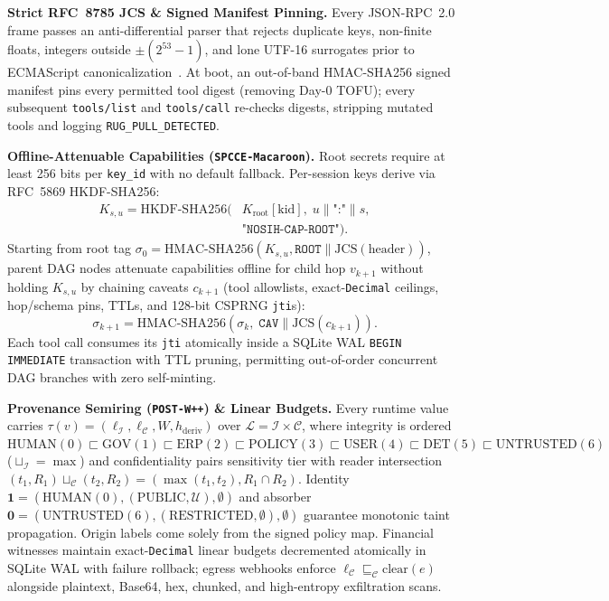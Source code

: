 \documentclass[10pt,twocolumn,letterpaper]{article}
\begin{document}
\textbf{Strict RFC~8785 JCS \& Signed Manifest Pinning.} Every JSON-RPC~2.0 frame passes an anti-differential parser that rejects duplicate keys, non-finite floats, integers outside $\pm(2^{53}-1)$, and lone UTF-16 surrogates prior to ECMAScript canonicalization~\cite{rfc8785}. At boot, an out-of-band HMAC-SHA256 signed manifest pins every permitted tool digest (removing Day-0 TOFU); every subsequent \texttt{tools/list} and \texttt{tools/call} re-checks digests, stripping mutated tools and logging \texttt{RUG\_PULL\_DETECTED}.

\textbf{Offline-Attenuable Capabilities (\texttt{SPCCE-Macaroon}).} Root secrets require at least 256 bits per \texttt{key\_id} with no default fallback. Per-session keys derive via RFC~5869 HKDF-SHA256:
\begin{equation}
\begin{aligned}
K_{s,u} = \text{HKDF-SHA256}\Big(&K_{\text{root}}[\text{kid}],\; u \parallel \texttt{":"} \parallel s,\\
&\texttt{"NOSIH-CAP-ROOT"}\Big).
\end{aligned}
\end{equation}
Starting from root tag $\sigma_0 = \text{HMAC-SHA256}(K_{s,u}, \texttt{ROOT}\parallel\text{JCS}(\text{header}))$, parent DAG nodes attenuate capabilities offline for child hop $v_{k+1}$ without holding $K_{s,u}$ by chaining caveats $c_{k+1}$ (tool allowlists, exact-\texttt{Decimal} ceilings, hop/schema pins, TTLs, and 128-bit CSPRNG \texttt{jti}s):
\begin{equation}
\sigma_{k+1} = \text{HMAC-SHA256}\!\left(\sigma_k,\; \texttt{CAV} \parallel \text{JCS}(c_{k+1})\right).
\end{equation}
Each tool call consumes its \texttt{jti} atomically inside a SQLite WAL \texttt{BEGIN IMMEDIATE} transaction with TTL pruning, permitting out-of-order concurrent DAG branches with zero self-minting.

\textbf{Provenance Semiring (\texttt{POST-W++}) \& Linear Budgets.} Every runtime value carries $\tau(v) = (\ell_{\mathcal{I}}, \ell_{\mathcal{C}}, W, h_{\text{deriv}})$ over $\mathcal{L} = \mathcal{I} \times \mathcal{C}$, where integrity is ordered $\text{HUMAN}(0) \sqsubset \text{GOV}(1) \sqsubset \text{ERP}(2) \sqsubset \text{POLICY}(3) \sqsubset \text{USER}(4) \sqsubset \text{DET}(5) \sqsubset \text{UNTRUSTED}(6)$ ($\sqcup_{\mathcal{I}}=\max$) and confidentiality pairs sensitivity tier with reader intersection $(t_1,R_1)\sqcup_{\mathcal{C}}(t_2,R_2)=(\max(t_1,t_2), R_1\cap R_2)$. Identity $\mathbf{1}=(\text{HUMAN}(0),(\text{PUBLIC},\mathcal{U}),\emptyset)$ and absorber $\mathbf{0}=(\text{UNTRUSTED}(6),(\text{RESTRICTED},\emptyset),\emptyset)$ guarantee monotonic taint propagation. Origin labels come solely from the signed policy map. Financial witnesses maintain exact-\texttt{Decimal} linear budgets decremented atomically in SQLite WAL with failure rollback; egress webhooks enforce $\ell_{\mathcal{C}} \sqsubseteq_{\mathcal{C}} \text{clear}(e)$ alongside plaintext, Base64, hex, chunked, and high-entropy exfiltration scans.
\end{document}
